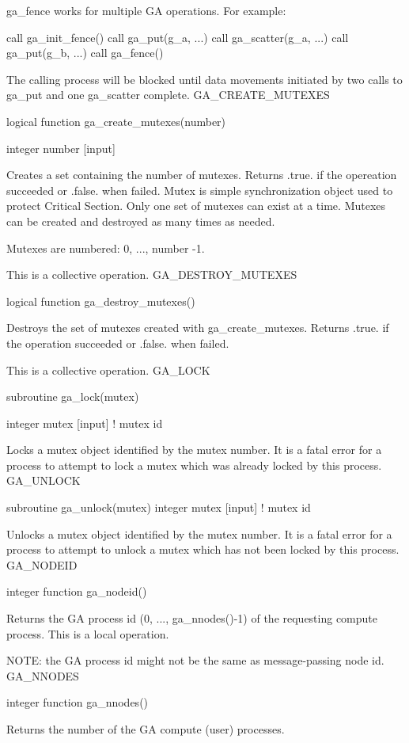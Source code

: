 ga\_fence works for multiple GA operations. For example:

call ga\_init\_fence() call ga\_put(g\_a, ...) call ga\_scatter(g\_a,
...) call ga\_put(g\_b, ...) call ga\_fence()

The calling process will be blocked until data movements initiated
by two calls to ga\_put and one ga\_scatter complete. GA\_CREATE\_MUTEXES

logical function ga\_create\_mutexes(number)

integer number {[}input{]}

Creates a set containing the number of mutexes. Returns .true. if
the opereation succeeded or .false. when failed. Mutex is simple synchronization
object used to protect Critical Section. Only one set of mutexes can
exist at a time. Mutexes can be created and destroyed as many times
as needed.

Mutexes are numbered: 0, ..., number -1.

This is a collective operation. GA\_DESTROY\_MUTEXES

logical function ga\_destroy\_mutexes()

Destroys the set of mutexes created with ga\_create\_mutexes. Returns
.true. if the operation succeeded or .false. when failed.

This is a collective operation. GA\_LOCK

subroutine ga\_lock(mutex)

integer mutex {[}input{]} ! mutex id

Locks a mutex object identified by the mutex number. It is a fatal
error for a process to attempt to lock a mutex which was already locked
by this process. GA\_UNLOCK

subroutine ga\_unlock(mutex) integer mutex {[}input{]} ! mutex id

Unlocks a mutex object identified by the mutex number. It is a fatal
error for a process to attempt to unlock a mutex which has not been
locked by this process. GA\_NODEID

integer function ga\_nodeid()

Returns the GA process id (0, ..., ga\_nnodes()-1) of the requesting
compute process. This is a local operation.

NOTE: the GA process id might not be the same as message-passing node
id. GA\_NNODES

integer function ga\_nnodes()

Returns the number of the GA compute (user) processes.

